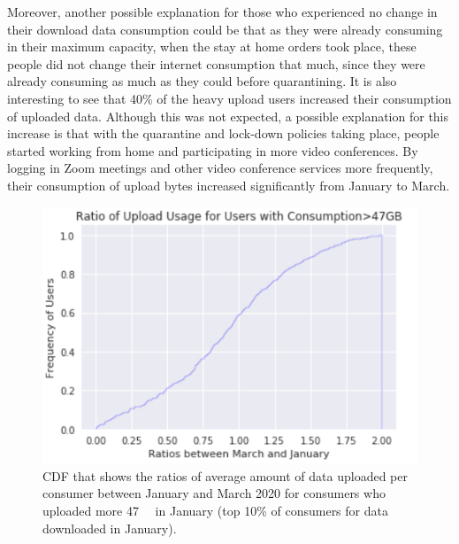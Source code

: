 \documentclass[conference,10pt]{IEEEtran}
\begin{document}
Moreover, another possible explanation for those who experienced no change in their download data consumption could be that as they were already consuming in their maximum capacity, when the stay at home orders took place, these people did not change their internet consumption that much, since they were already consuming as much as they could before quarantining. It is also interesting to see that 40\% of the heavy upload users increased their consumption of uploaded data. Although this was not expected, a possible explanation for this increase is that with the quarantine and lock-down policies taking place, people started working from home and participating in more video conferences. By logging in Zoom meetings and other video conference services more frequently, their consumption of upload bytes increased significantly from January to March.
\begin{figure}
\centering
\includegraphics[width=1.0\linewidth]{figs/heavyup.PNG}
\caption{CDF that shows the ratios of average amount of data uploaded per consumer between January and March 2020 for consumers who uploaded more \SI{47}{\giga\byte} in January (top 10\% of consumers for data downloaded in January).}
\label{fig:heavyup}
\end{figure}

\end{document}
